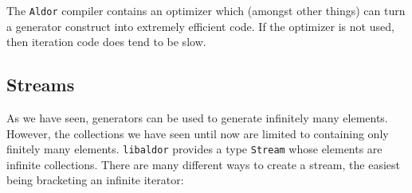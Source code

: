 \documentclass{article}
\newcommand{\libaldor}{{\tt libaldor}}
\newcommand{\Aldor}{{\tt Aldor}}
\begin{document}
The \Aldor{} compiler contains an optimizer which (amongst other
things) can turn a generator construct into extremely efficient code.
If the optimizer is not used, then iteration code does tend to be slow.

\subsection{Streams}
As we have seen, generators can be used to generate infinitely many
elements. However, the collections we have seen until now are limited
to containing only finitely many elements. \libaldor{} provides a type
{\tt Stream} whose elements are infinite collections. There are many
different ways to create a stream, the easiest being bracketing an
infinite iterator:
\end{document}

